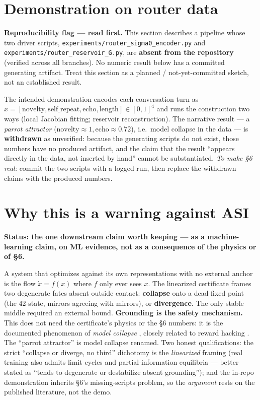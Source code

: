 \documentclass[11pt]{article}
\theoremstyle{definition}
\begin{document}
\section{Demonstration on router data}
\label{sec:demo}
\begin{brokenbox}
\textbf{Reproducibility flag --- read first.} This section describes a pipeline
whose two driver scripts, \texttt{experiments/router\_sigma0\_encoder.py} and
\texttt{experiments/router\_reservoir\_G.py}, are \textbf{absent from the
repository} (verified across all branches). No numeric result below has a committed
generating artifact. Treat this section as a planned / not-yet-committed sketch, not
an established result.
\end{brokenbox}
The intended demonstration encodes each conversation turn as
$x=[\text{novelty},\text{self\_repeat},\text{echo},\text{length}]\in[0,1]^4$ and
runs the construction two ways (local Jacobian fitting; reservoir reconstruction).
The narrative result --- a \emph{parrot attractor}
($\text{novelty}\approx1,\text{echo}\approx0.72$), i.e.\ model collapse in the data
--- is \textbf{withdrawn} as unverified: because the generating scripts do not
exist, those numbers have no produced artifact, and the claim that the result
``appears directly in the data, not inserted by hand'' cannot be substantiated.
\emph{To make \S6 real:} commit the two scripts with a logged run, then replace the
withdrawn claims with the produced numbers.

\section{Why this is a warning against ASI}
\begin{verifybox}
\textbf{Status: the one downstream claim worth keeping --- as a machine-learning
claim, on ML evidence, not as a consequence of the physics or of \S6.}
\end{verifybox}
A system that optimizes against its own representations with no external anchor is
the flow $\dot x = f(x)$ where $f$ only ever sees $x$. The linearized certificate
frames two degenerate fates absent outside contact: \textbf{collapse} onto a dead
fixed point (the 42-state, mirrors agreeing with mirrors), or \textbf{divergence}.
The only stable middle required an external bound. \textbf{Grounding is the safety
mechanism.} This does not need the certificate's physics or the \S6 numbers: it is
the documented phenomenon of \emph{model collapse} \cite{shumailov2024}, closely
related to reward hacking \cite{amodei2016}. The ``parrot attractor'' is model
collapse renamed. Two honest qualifications: the strict ``collapse or diverge, no
third'' dichotomy is the \emph{linearized} framing (real training also admits limit
cycles and partial-information equilibria --- better stated as ``tends to degenerate
or destabilize absent grounding''); and the in-repo demonstration inherits \S6's
missing-scripts problem, so the \emph{argument} rests on the published literature,
not the demo.
\end{document}
